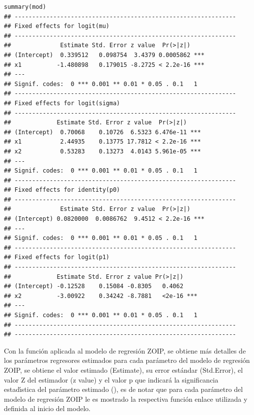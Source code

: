 \begin{verbatim}
summary(mod)
## ---------------------------------------------------------------
## Fixed effects for logit(mu) 
## ---------------------------------------------------------------
##              Estimate Std. Error z value  Pr(>|z|)    
## (Intercept)  0.339512   0.098754  3.4379 0.0005862 ***
## x1          -1.480898   0.179015 -8.2725 < 2.2e-16 ***
## ---
## Signif. codes:  0 *** 0.001 ** 0.01 * 0.05 . 0.1   1
## ---------------------------------------------------------------
## Fixed effects for logit(sigma) 
## ---------------------------------------------------------------
##             Estimate Std. Error z value  Pr(>|z|)    
## (Intercept)  0.70068    0.10726  6.5323 6.476e-11 ***
## x1           2.44935    0.13775 17.7812 < 2.2e-16 ***
## x2           0.53283    0.13273  4.0143 5.961e-05 ***
## ---
## Signif. codes:  0 *** 0.001 ** 0.01 * 0.05 . 0.1   1
## ---------------------------------------------------------------
## Fixed effects for identity(p0) 
## ---------------------------------------------------------------
##              Estimate Std. Error z value  Pr(>|z|)    
## (Intercept) 0.0820000  0.0086762  9.4512 < 2.2e-16 ***
## ---
## Signif. codes:  0 *** 0.001 ** 0.01 * 0.05 . 0.1   1
## ---------------------------------------------------------------
## Fixed effects for logit(p1) 
## ---------------------------------------------------------------
##             Estimate Std. Error z value Pr(>|z|)    
## (Intercept) -0.12528    0.15084 -0.8305   0.4062    
## x2          -3.00922    0.34242 -8.7881   <2e-16 ***
## ---
## Signif. codes:  0 *** 0.001 ** 0.01 * 0.05 . 0.1   1
## ---------------------------------------------------------------
## ---------------------------------------------------------------
\end{verbatim}

Con la funci\'{o}n  aplicada al modelo de regresi\'{o}n ZOIP, se obtiene m\'{a}s detalles de los par\'{a}metros regresores estimados para cada par\'{a}metro del modelo de regresi\'{o}n ZOIP, se obtiene el valor estimado (Estimate), su error est\'{a}ndar (Std.Error), el valor Z del estimador (z value) y el valor p que indicar\'{a} la significancia estad\'{\i}stica del par\'{a}metro estimado (), es de notar que para cada par\'{a}metro del modelo de regresi\'{o}n ZOIP le es mostrado la respectiva funci\'{o}n enlace utilizada y definida al inicio del modelo.

